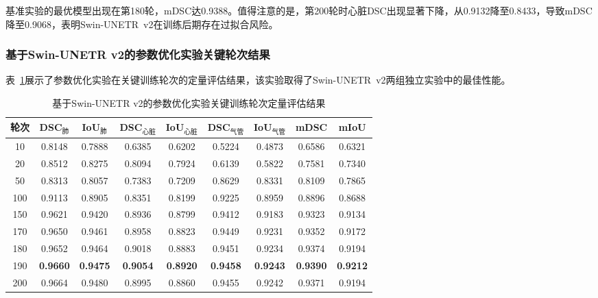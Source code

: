 \documentclass[12pt, a4paper]{article}
\begin{document}
基准实验的最优模型出现在第180轮，mDSC达0.9388。值得注意的是，第200轮时心脏DSC出现显著下降，从0.9132降至0.8433，导致mDSC降至0.9068，表明Swin-UNETR~v2在训练后期存在过拟合风险。

\subsubsection{基于Swin-UNETR v2的参数优化实验关键轮次结果}

表~\ref{tab:results_exp2}展示了参数优化实验在关键训练轮次的定量评估结果，该实验取得了Swin-UNETR~v2两组独立实验中的最佳性能。

\begin{table}[H]
    \centering
    \caption{基于Swin-UNETR v2的参数优化实验关键训练轮次定量评估结果}
    \label{tab:results_exp2}
    \small
    \begin{adjustbox}{max width=\textwidth}
    \begin{tabular}{@{}ccccccccc@{}}
        \toprule
        \textbf{轮次} & \textbf{DSC$_\text{肺}$} & \textbf{IoU$_\text{肺}$} & \textbf{DSC$_\text{心脏}$} & \textbf{IoU$_\text{心脏}$} & \textbf{DSC$_\text{气管}$} & \textbf{IoU$_\text{气管}$} & \textbf{mDSC} & \textbf{mIoU} \\
        \midrule
        10 & 0.8148 & 0.7888 & 0.6385 & 0.6202 & 0.5224 & 0.4873 & 0.6586 & 0.6321 \\
        20 & 0.8512 & 0.8275 & 0.8094 & 0.7924 & 0.6139 & 0.5822 & 0.7581 & 0.7340 \\
        50 & 0.8313 & 0.8057 & 0.7383 & 0.7209 & 0.8629 & 0.8331 & 0.8109 & 0.7865 \\
        100 & 0.9113 & 0.8905 & 0.8351 & 0.8199 & 0.9225 & 0.8959 & 0.8896 & 0.8688 \\
        150 & 0.9621 & 0.9420 & 0.8936 & 0.8799 & 0.9412 & 0.9183 & 0.9323 & 0.9134 \\
        170 & 0.9650 & 0.9461 & 0.8958 & 0.8823 & 0.9449 & 0.9231 & 0.9352 & 0.9172 \\
        180 & 0.9652 & 0.9464 & 0.9018 & 0.8883 & 0.9451 & 0.9234 & 0.9374 & 0.9194 \\
        190 & \textbf{0.9660} & \textbf{0.9475} & \textbf{0.9054} & \textbf{0.8920} & \textbf{0.9458} & \textbf{0.9243} & \textbf{0.9390} & \textbf{0.9212} \\
        200 & 0.9664 & 0.9480 & 0.8995 & 0.8860 & 0.9455 & 0.9242 & 0.9371 & 0.9194 \\
        \bottomrule
    \end{tabular}
    \end{adjustbox}
\end{table}
\end{document}
